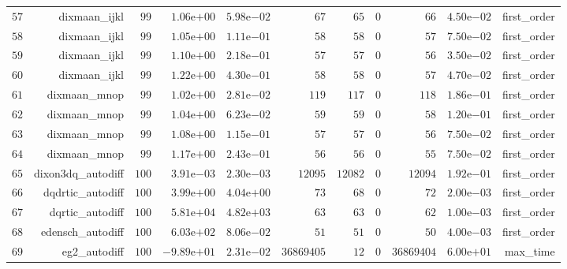 \documentclass[varwidth=20cm,crop=true]{standalone}
\begin{document}
\begin{longtable}{rrrrrrrrrrr}
  \(    57\) & dixmaan\_ijkl & \(    99\) & \( 1.06\)e\(+00\) & \( 5.98\)e\(-02\) & \(    67\) & \(    65\) & \(     0\) & \(    66\) & \( 4.50\)e\(-02\) & first\_order \\
  \(    58\) & dixmaan\_ijkl & \(    99\) & \( 1.05\)e\(+00\) & \( 1.11\)e\(-01\) & \(    58\) & \(    58\) & \(     0\) & \(    57\) & \( 7.50\)e\(-02\) & first\_order \\
  \(    59\) & dixmaan\_ijkl & \(    99\) & \( 1.10\)e\(+00\) & \( 2.18\)e\(-01\) & \(    57\) & \(    57\) & \(     0\) & \(    56\) & \( 3.50\)e\(-02\) & first\_order \\
  \(    60\) & dixmaan\_ijkl & \(    99\) & \( 1.22\)e\(+00\) & \( 4.30\)e\(-01\) & \(    58\) & \(    58\) & \(     0\) & \(    57\) & \( 4.70\)e\(-02\) & first\_order \\
  \(    61\) & dixmaan\_mnop & \(    99\) & \( 1.02\)e\(+00\) & \( 2.81\)e\(-02\) & \(   119\) & \(   117\) & \(     0\) & \(   118\) & \( 1.86\)e\(-01\) & first\_order \\
  \(    62\) & dixmaan\_mnop & \(    99\) & \( 1.04\)e\(+00\) & \( 6.23\)e\(-02\) & \(    59\) & \(    59\) & \(     0\) & \(    58\) & \( 1.20\)e\(-01\) & first\_order \\
  \(    63\) & dixmaan\_mnop & \(    99\) & \( 1.08\)e\(+00\) & \( 1.15\)e\(-01\) & \(    57\) & \(    57\) & \(     0\) & \(    56\) & \( 7.50\)e\(-02\) & first\_order \\
  \(    64\) & dixmaan\_mnop & \(    99\) & \( 1.17\)e\(+00\) & \( 2.43\)e\(-01\) & \(    56\) & \(    56\) & \(     0\) & \(    55\) & \( 7.50\)e\(-02\) & first\_order \\
  \(    65\) & dixon3dq\_autodiff & \(   100\) & \( 3.91\)e\(-03\) & \( 2.30\)e\(-03\) & \( 12095\) & \( 12082\) & \(     0\) & \( 12094\) & \( 1.92\)e\(-01\) & first\_order \\
  \(    66\) & dqdrtic\_autodiff & \(   100\) & \( 3.99\)e\(+00\) & \( 4.04\)e\(+00\) & \(    73\) & \(    68\) & \(     0\) & \(    72\) & \( 2.00\)e\(-03\) & first\_order \\
  \(    67\) & dqrtic\_autodiff & \(   100\) & \( 5.81\)e\(+04\) & \( 4.82\)e\(+03\) & \(    63\) & \(    63\) & \(     0\) & \(    62\) & \( 1.00\)e\(-03\) & first\_order \\
  \(    68\) & edensch\_autodiff & \(   100\) & \( 6.03\)e\(+02\) & \( 8.06\)e\(-02\) & \(    51\) & \(    51\) & \(     0\) & \(    50\) & \( 4.00\)e\(-03\) & first\_order \\
  \(    69\) & eg2\_autodiff & \(   100\) & \(-9.89\)e\(+01\) & \( 2.31\)e\(-02\) & \(36869405\) & \(    12\) & \(     0\) & \(36869404\) & \( 6.00\)e\(+01\) & max\_time \\

\end{longtable}
\end{document}
